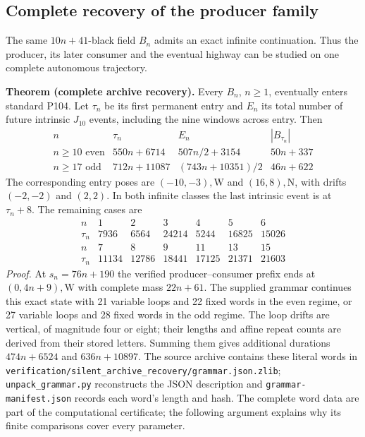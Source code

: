 \subsection{Complete recovery of the producer family}
The same $10n+41$-black field $B_n$ admits an exact infinite continuation.
Thus the producer, its later consumer and the eventual highway can be studied
on one complete autonomous trajectory.

\textbf{Theorem (complete archive recovery).}
Every $B_n$, $n\ge1$, eventually enters standard P104. Let $\tau_n$ be its
first permanent entry and $E_n$ its total number of future intrinsic $J_{10}$
events, including the nine windows across entry. Then
\begingroup\renewcommand{\arraystretch}{1.3}
\[
\begin{array}{c|c|c|c}
 n&\tau_n&E_n&|B_{\tau_n}|\\\hline
 n\ge10\text{ even}&550n+6714&507n/2+3154&50n+337\\
 n\ge17\text{ odd}&712n+11087&(743n+10351)/2&46n+622
\end{array}
\]
The corresponding entry poses are $(-10,-3),\mathrm W$ and
$(16,8),\mathrm N$, with drifts $(-2,-2)$ and $(2,2)$. In both infinite
classes the last intrinsic event is at $\tau_n+8$. The remaining cases are
\[
\begin{array}{c|rrrrrr}
n&1&2&3&4&5&6\\\hline
\tau_n&7936&6564&24214&5244&16825&15026\\\hline
n&7&8&9&11&13&15\\\hline
\tau_n&11134&12786&18441&17125&21371&21603
\end{array}
\]
\endgroup
\textit{Proof.}
At $s_n=76n+190$ the verified producer--consumer prefix ends at
$(0,4n+9),\mathrm W$ with complete mass $22n+61$. The supplied grammar
continues this exact state with 21 variable loops and 22 fixed words in the
even regime, or 27 variable loops and 28 fixed words in the odd regime.
The loop drifts are vertical, of magnitude four or eight; their lengths and
affine repeat counts are derived from their stored letters. Summing them
gives additional durations $474n+6524$ and $636n+10897$.
The source archive contains these literal words in
\texttt{verification/silent\_archive\_recovery/grammar.json.zlib};
\texttt{unpack\_grammar.py} reconstructs the JSON description and
\texttt{grammar-manifest.json} records each word's length and hash.
The complete word data are part of the computational certificate; the
following argument explains why its finite comparisons cover every parameter.

